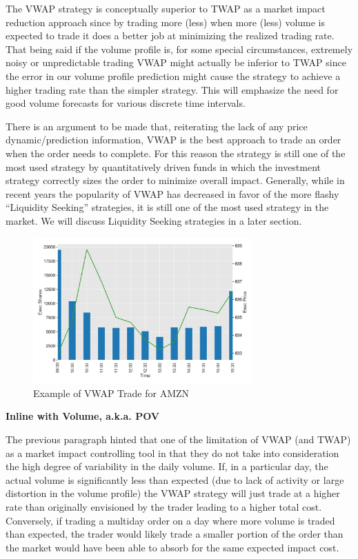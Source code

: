 The VWAP strategy is conceptually superior to TWAP as a market impact reduction approach since by trading more (less) when more  (less) volume is expected to trade it does a better job at minimizing the realized trading rate. That being said if the volume profile is, for some special circumstances, extremely noisy or unpredictable trading VWAP might actually be inferior to TWAP since the error in our volume profile prediction might cause the strategy to achieve a higher trading rate than the simpler strategy. This will emphasize the need for good volume forecasts for various discrete time intervals.


There is an argument to be made that, reiterating the lack of any price dynamic/prediction information, VWAP is the best approach to trade an order when the order needs to complete. For this reason the strategy is still one of the most used strategy by quantitatively driven funds in which the investment strategy correctly sizes the order to minimize overall impact. Generally, while in recent years the popularity of VWAP has decreased in favor of the more flashy ``Liquidity Seeking'' strategies, it is still one of the most used strategy in the market. We will discuss Liquidity Seeking strategies in a later section. \twomedskip


        \begin{figure}[!ht]
        \centering
        \includegraphics[width=0.75\textwidth]{chapters/chapter_exec_models/figures/vwap.png} 
        \caption{Example of VWAP Trade for AMZN\label{fig:vwap}}
        \end{figure}


\noindent\textbf{Inline with Volume, a.k.a. POV} \twomedskip


The previous paragraph hinted that one of the limitation of VWAP (and TWAP) as a market impact controlling tool in that they do not take into consideration the high degree of variability in the daily volume. If, in a particular day, the actual volume is significantly less than expected (due to lack of activity or large distortion in the volume profile) the VWAP strategy will just trade at a higher rate than originally envisioned by the trader leading to a higher total cost. Conversely, if trading a multiday order on a day where more volume is traded than expected, the trader would likely trade a smaller portion of the order than the market would have been able to absorb for the same expected impact cost.


